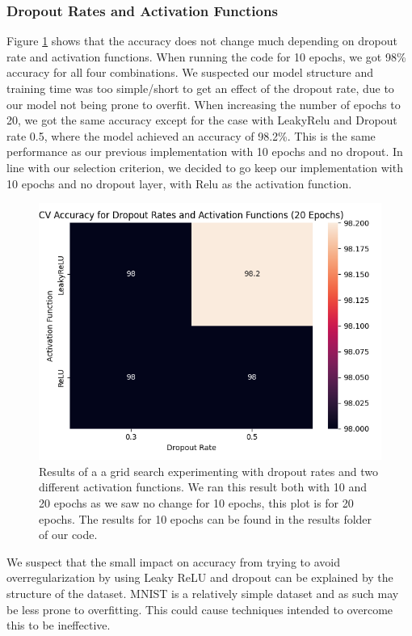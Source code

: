 \newpage
\subsubsection{Dropout Rates and Activation Functions}
 Figure \ref{fig:cnn_pp} shows that the accuracy does not change much depending on dropout rate and activation functions. When running the code for 10 epochs, we got 98\% accuracy for all four combinations. We suspected our model structure and training time was too simple/short to get an effect of the dropout rate, due to our model not being prone to overfit. When increasing the number of epochs to 20, we got the same accuracy except for the case with LeakyRelu and Dropout rate 0.5, where the model achieved an accuracy of 98.2\%. This is the same performance as our previous implementation with 10 epochs and no dropout. In line with our selection criterion, we decided to go keep our implementation with 10 epochs and no dropout layer, with Relu as the activation function. 

\begin{figure}[h]
    \centering
    \includegraphics[width=\linewidth]{results/cnn_grid_search/heatmap_grid_search_da.png}
    \caption{Results of a a grid search experimenting with dropout rates and two different activation functions. We ran this result both with 10 and 20 epochs as we saw no change for 10 epochs, this plot is for 20 epochs. The results for 10 epochs can be found in the results folder of our code.}
    \label{fig:cnn_pp}
\end{figure}

We suspect that the small impact on accuracy from trying to avoid overregularization by using Leaky ReLU and dropout can be explained by the structure of the dataset. MNIST is a relatively simple dataset and as such may be less prone to overfitting. This could cause techniques intended to overcome this to be ineffective.

